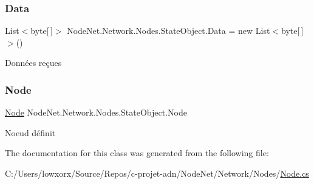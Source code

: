 \subsubsection{\texorpdfstring{Data}{Data}}
{\footnotesize\ttfamily List$<$byte\mbox{[}$\,$\mbox{]}$>$ Node\+Net.\+Network.\+Nodes.\+State\+Object.\+Data = new List$<$byte\mbox{[}$\,$\mbox{]}$>$()}



Données reçues 

\mbox{\label{class_node_net_1_1_network_1_1_nodes_1_1_state_object_a40fa1f5f19ed68d0f90ea2ea6e393dc5}} 
\subsubsection{\texorpdfstring{Node}{Node}}
{\footnotesize\ttfamily \hyperlink{class_node_net_1_1_network_1_1_nodes_1_1_node}{Node} Node\+Net.\+Network.\+Nodes.\+State\+Object.\+Node}



Noeud définit 



The documentation for this class was generated from the following file\+:\begin{DoxyCompactItemize}
\item 
C\+:/\+Users/lowxorx/\+Source/\+Repos/c-\/projet-\/adn/\+Node\+Net/\+Network/\+Nodes/\hyperlink{_node_8cs}{Node.\+cs}\end{DoxyCompactItemize}
